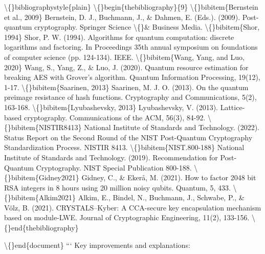 \documentclass{article}
\begin{document}
\textbackslash\{\}bibliographystyle\{plain\}
\textbackslash\{\}begin\{thebibliography\}\{9\}
\textbackslash\{\}bibitem\{Bernstein et al., 2009\} Bernstein, D. J., Buchmann, J., \& Dahmen, E. (Eds.). (2009). Post-quantum cryptography. Springer Science \textbackslash\{\}\& Business Media.
\textbackslash\{\}bibitem\{Shor, 1994\} Shor, P. W. (1994). Algorithms for quantum computation: discrete logarithms and factoring. In Proceedings 35th annual symposium on foundations of computer science (pp. 124-134). IEEE.
\textbackslash\{\}bibitem\{Wang, Yang, and Luo, 2020\} Wang, S., Yang, Z., \& Luo, J. (2020). Quantum resource estimation for breaking AES with Grover's algorithm. Quantum Information Processing, 19(12), 1-17.
\textbackslash\{\}bibitem\{Saarinen, 2013\} Saarinen, M. J. O. (2013). On the quantum preimage resistance of hash functions. Cryptography and Communications, 5(2), 163-168.
\textbackslash\{\}bibitem\{Lyubashevsky, 2013\} Lyubashevsky, V. (2013). Lattice-based cryptography. Communications of the ACM, 56(3), 84-92.
\textbackslash\{\}bibitem\{NISTIR8413\} National Institute of Standards and Technology. (2022). Status Report on the Second Round of the NIST Post-Quantum Cryptography Standardization Process. NISTIR 8413.
\textbackslash\{\}bibitem\{NIST.800-188\} National Institute of Standards and Technology. (2019). Recommendation for Post-Quantum Cryptography. NIST Special Publication 800-188.
\textbackslash\{\}bibitem\{Gidney2021\} Gidney, C., \& Ekerå, M. (2021). How to factor 2048 bit RSA integers in 8 hours using 20 million noisy qubits. Quantum, 5, 433.
\textbackslash\{\}bibitem\{Alkim2021\} Alkim, E., Bindel, N., Buchmann, J., Schwabe, P., \& Völz, B. (2021). CRYSTALS–Kyber: A CCA-secure key encapsulation mechanism based on module-LWE. Journal of Cryptographic Engineering, 11(2), 133-156.
\textbackslash\{\}end\{thebibliography\}

\textbackslash\{\}end\{document\}
```
Key improvements and explanations:
\end{document}
